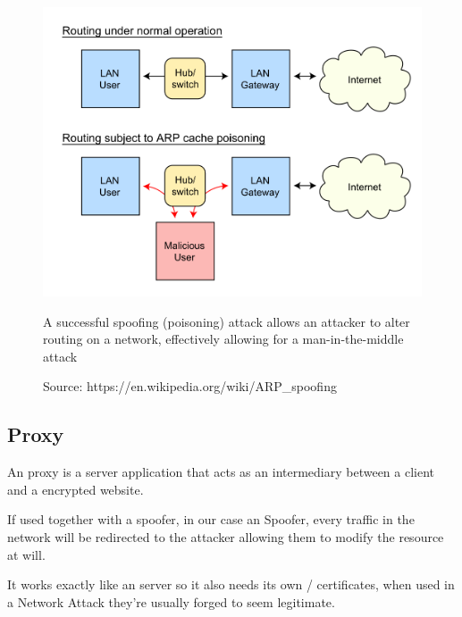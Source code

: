 \begin{figure}[h!]
 \centering
 \includegraphics[width=13cm]{img/ARP_Spoofing.png}
 \caption{A successful  spoofing (poisoning) attack allows an attacker to alter routing on a network, effectively allowing for a man-in-the-middle attack}
 \caption*{Source: https://en.wikipedia.org/wiki/ARP\_spoofing}
 \label{fig: ARP Spoofing}
\end{figure}

\newpage

\subsection{ Proxy}

An  proxy is a server application that acts as an intermediary between a client and a  encrypted website.

If used together with a spoofer, in our case an  Spoofer, every  traffic in the network will be redirected to the attacker allowing them to modify the resource at will.

It works exactly like an  server so it also needs its own / certificates, when used in a Network Attack they're usually forged to seem legitimate.

